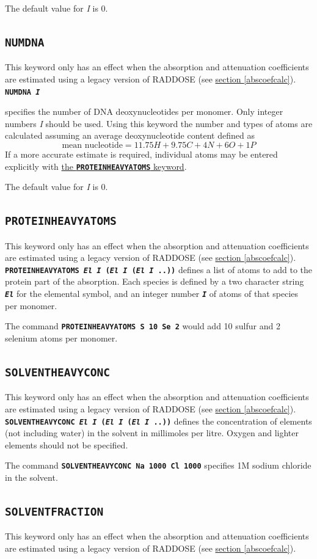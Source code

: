 \documentclass[a4paper]{article}
\newcommand{\Keyword}[1]{\texttt{\textbf{#1}}\xspace}
\newcommand{\SB}{\\[0.2em]}
\newcommand{\RDLegacyKeyword}{This keyword only has an effect when the absorption and attenuation coefficients are estimated using a legacy version of RADDOSE (see \hyperref[abscoefcalc]{section \ref*{abscoefcalc}}).\SB
}
\begin{document}
The default value for \textit{I} is 0.


\subsection{\Keyword{NUMDNA}}
\label{numdna}
\RDLegacyKeyword

\noindent \Keyword{NUMDNA \textit{I}}

specifies the number of DNA deoxynucleotides per monomer. Only integer numbers \textit{I} should be used. Using this keyword the number and types of atoms are calculated assuming an average deoxynucleotide content defined as
\[ \mbox{mean nucleotide} = 11.75H + 9.75C + 4N + 6O + 1P \]
If a more accurate estimate is required, individual atoms may be entered explicitly with \hyperref[proteinheavyatoms]{the \Keyword{PROTEINHEAVYATOMS} keyword}.

The default value for \textit{I} is 0.


\subsection{\Keyword{PROTEINHEAVYATOMS}}
\label{proteinheavyatoms}
\RDLegacyKeyword

\noindent \Keyword{PROTEINHEAVYATOMS \textit{El I} (\textit{El I} (\textit{El I} ..))}
defines a list of atoms to add to the protein part of the absorption. Each species is defined by a two character string \Keyword{\textit{El}} for the elemental symbol, and an integer number \Keyword{\textit{I}} of atoms of that species per monomer.

The command \Keyword{PROTEINHEAVYATOMS S 10 Se 2} would add 10 sulfur and 2 selenium atoms per monomer.


\subsection{\Keyword{SOLVENTHEAVYCONC}}
\label{solventheavyconc}
\RDLegacyKeyword

\noindent \Keyword{SOLVENTHEAVYCONC \textit{El I} (\textit{El I} (\textit{El I} ..))}
defines the concentration of elements (not including water) in the solvent in millimoles per litre. Oxygen and lighter elements should not be specified.

The command \Keyword{SOLVENTHEAVYCONC Na 1000 Cl 1000} specifies 1M sodium chloride in the solvent.


\subsection{\Keyword{SOLVENTFRACTION}}
\label{solventfraction}
\RDLegacyKeyword
\end{document}
